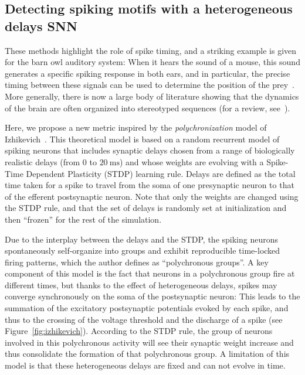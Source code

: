 \documentclass[runningheads]{llncs}
\newcommand{\ms}{\si{\milli\second}}%
\begin{document}
\subsection{Detecting spiking motifs with a heterogeneous delays SNN}
%
These methods highlight the role of spike timing, and a striking example is given for the barn owl auditory system: When it hears the sound of a mouse, this sound generates a specific spiking response in both ears, and in particular, the precise timing between these signals can be used to determine the position of the prey~\cite{goodman_spike-timing-based_2010}. More generally, there is now a large body of literature showing that the dynamics of the brain are often organized into stereotyped sequences (for a review, see~\cite{grimaldi_precise_2022}).

Here, we propose a new metric inspired by the \textit{polychronization} model of Izhikevich~\cite{izhikevich_polychronization_2006}. This theoretical model is based on a random recurrent model of spiking neurons that includes synaptic delays chosen from a range of biologically realistic delays (from $0$ to $20~\ms$) and whose weights are evolving with a Spike-Time Dependent Plasticity (STDP) learning rule. Delays are defined as the total time taken for a spike to travel from the soma of one presynaptic neuron to that of the efferent postsynaptic neuron. Note that only the weights are changed using the STDP rule, and that the set of delays is randomly set at initialization and then ``frozen'' for the rest of the simulation. 

Due to the interplay between the delays and the STDP, the spiking neurons spontaneously self-organize into groups and %
exhibit reproducible time-locked firing patterns, which the author defines as ``polychronous groups''. A key component of this model is the fact that neurons in a polychronous group fire at different times, but thanks to the effect of heterogeneous delays, spikes may converge synchronously on the soma of the postsynaptic neuron: This leads to the summation of the excitatory postsynaptic potentials evoked by each spike, and thus to the crossing of the voltage threshold and the discharge of a spike (see Figure~\ref{fig:izhikevich}). According to the STDP rule, the group of neurons involved in this polychronous activity will see their synaptic weight increase and thus  consolidate the formation of that polychronous group.  A limitation of this model is that these heterogeneous delays are fixed and can not evolve in time.
\end{document}
